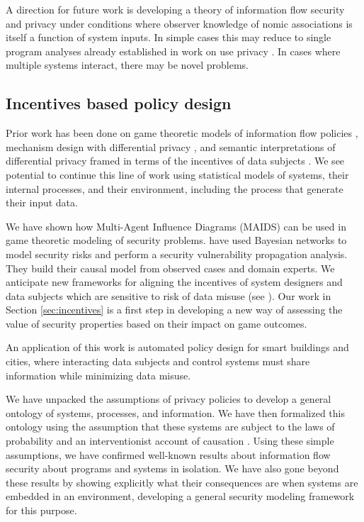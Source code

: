 \documentclass[../thesis.tex]{subfiles}
\begin{document}
A direction for future work is developing a
theory of information flow security and privacy
under conditions where observer knowledge of
nomic associations is itself a function of system
inputs. In simple cases this may reduce
to single program analyses already established
in work on use privacy \cite{datta2017use}.
In cases where multiple systems interact,
there may be novel problems.

\subsection{Incentives based policy design}

Prior work has been done on game theoretic
models of information flow policies \cite{barth07csf},
mechanism design with differential privacy
\cite{mcsherry2007mechanism}, and 
semantic interpretations of differential privacy
framed in terms of the incentives of data subjects
\cite{kasivisiwanathan14jpc}.
We see potential to continue this line of work
using statistical models of systems, their
internal processes, and their environment,
including the process that generate their
input data.

We have shown how Multi-Agent Influence Diagrams
(MAIDS) \cite{koller2003multi} can be used in
game theoretic modeling of security problems.
\cite{feng2014security} have used Bayesian networks
to model security risks and perform a security
vulnerability propagation analysis.
They build their causal model from observed cases
and domain experts.
We anticipate
new frameworks for aligning the incentives
of system designers and data subjects which
are sensitive to risk of data misuse (see
\cite{brooks15nist}).
Our work in Section \ref{sec:incentives} is
a first step in developing a new way of assessing
the value of security properties based on
their impact on game outcomes.

An application of this work is automated policy
design for smart buildings and cities, where
interacting data subjects and control systems
must share information while minimizing data
misuse.

\hfill
\hfill

We have unpacked the assumptions of privacy
policies to develop a general ontology of systems,
processes, and information.
We have then formalized this ontology using the
assumption that these systems are subject to
the laws of probability and an interventionist
account of causation \cite{woodward2005making}.
Using these simple assumptions, we have
confirmed well-known results about information
flow security about programs and systems in
isolation.
We have also gone beyond these results by showing
explicitly what their consequences are when
systems are embedded in an environment, developing
a general security modeling framework for this purpose.
\end{document}
